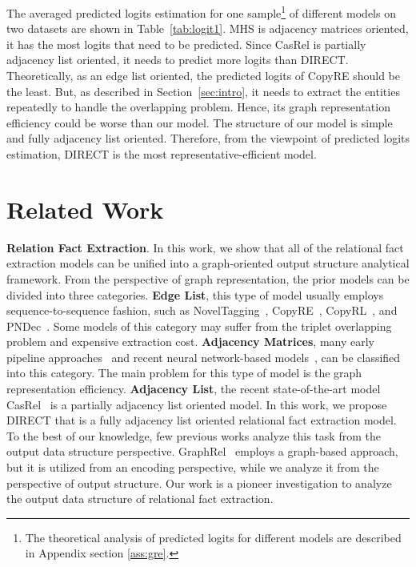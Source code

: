 \documentclass[11pt,a4paper]{article}
\begin{document}
The averaged predicted logits estimation for one sample\footnote{The theoretical analysis of predicted logits for different models are described in Appendix section \ref{ass:gre}.} of different models on two datasets are shown in Table~\ref{tab:logit1}. MHS is adjacency matrices oriented, it has the most logits that need to be predicted. Since CasRel is partially adjacency list oriented, it needs to predict more logits than DIRECT. Theoretically, as an edge list oriented, the predicted logits of CopyRE should be the least. But, as described in Section~\ref{sec:intro}, it needs to extract the entities repeatedly to handle the overlapping problem. Hence, its graph representation efficiency could be worse than our model. The structure of our model is simple and fully adjacency list oriented. Therefore, from the viewpoint of predicted logits estimation, DIRECT is the most representative-efficient model. \section{Related Work}\label{review}
\textbf{Relation Fact Extraction}. In this work, we show that all of the relational fact extraction models can be unified into a graph-oriented output structure analytical framework. From the perspective of graph representation, the prior models can be divided into three categories.
\textbf{Edge List}, this type of model usually employs sequence-to-sequence fashion, such as NovelTagging~\cite{zheng2017joint}, CopyRE~\cite{zeng2018extracting}, CopyRL~\cite{zeng2019learning}, and PNDec~\cite{nayak2020effective}. Some models of this category may suffer from the triplet overlapping problem and expensive extraction cost. \textbf{Adjacency Matrices}, many early pipeline approaches~\cite{zelenko2003kernel,zhou2005exploring,mintz2009distant} and recent neural network-based models~\cite{bekoulis2018joint,dai2019joint,fu2019graphrel}, can be classified into this category. The main problem for this type of model is the graph representation efficiency. \textbf{Adjacency List}, the recent state-of-the-art model CasRel~\cite{wei2020novel} is a partially adjacency list oriented model. In this work, we propose DIRECT that is a fully adjacency list oriented relational fact extraction model. To the best of our knowledge, few previous works analyze this task from the output data structure perspective. GraphRel~\cite{fu2019graphrel} employs a graph-based approach, but it is utilized from an encoding perspective, while we analyze it from the perspective of output structure. Our work is a pioneer investigation to analyze the output data structure of relational fact extraction.
\end{document}
